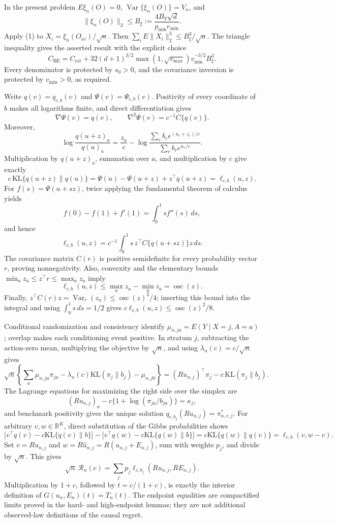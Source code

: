 In the present problem \(E\xi_n(O)=0\), \(\operatorname{Var}\{\xi_n(O)\}=V_n\), and
\[
 \|\xi_n(O)\|_2\le B_\xi:=\frac{4B_Y\sqrt d}{p_{\min}e_{\min}}.
\]
Apply (1) to \(X_i=\xi_n(O_{ni})/\sqrt n\).  Then \(\sum_iE\|X_i\|_2^3\le B_\xi^3/\sqrt n\).  The triangle inequality gives the asserted result with the explicit choice
\[
 C_{\mathrm{BE}}=C_{\mathrm{rat}}+
 32(d+1)^{3/2}\max(1,\sqrt{v_{\max}})v_{\min}^{-3/2}B_\xi^3.
\]
Every denominator is protected by \(s_0>0\), and the covariance inversion is protected by \(v_{\min}>0\), as required.

Write \(q(v)=q_{c,b}(v)\) and \(\Psi(v)=\Psi_{c,b}(v)\).  Positivity of every coordinate of \(b\) makes all logarithms finite, and direct differentiation gives
\[
 \nabla\Psi(v)=q(v),\qquad \nabla^2\Psi(v)=c^{-1}C\{q(v)\}.
\]
Moreover,
\[
 \log\frac{q(u+z)_a}{q(u)_a}
 =\frac{z_a}{c}-\log\frac{\sum_rb_r e^{(u_r+z_r)/c}}
                              {\sum_rb_r e^{u_r/c}}.
\]
Multiplication by \(q(u+z)_a\), summation over \(a\), and multiplication by \(c\) give exactly
\[
 c\,\mathrm{KL}\{q(u+z)\|q(u)\}
 =\Psi(u)-\Psi(u+z)+z^\top q(u+z)=\ell_{c,b}(u,z).
\]
For \(f(s)=\Psi(u+sz)\), twice applying the fundamental theorem of calculus yields
\[
 f(0)-f(1)+f'(1)=\int_0^1s f''(s)\,ds,
\]
and hence
\[
 \ell_{c,b}(u,z)=c^{-1}\int_0^1s\,z^\top C\{q(u+sz)\}z\,ds.
\]
The covariance matrix \(C(r)\) is positive semidefinite for every probability vector \(r\), proving nonnegativity.  Also, convexity and the elementary bounds \(\min_a z_a\le z^\top r\le\max_a z_a\) imply
\[
 \ell_{c,b}(u,z)\le \max_a z_a-\min_a z_a=\operatorname{osc}(z).
\]
Finally, \(z^\top C(r)z=\operatorname{Var}_r(z_a)\le\operatorname{osc}(z)^2/4\); inserting this bound into the integral and using \(\int_0^1s\,ds=1/2\) gives \(c\ell_{c,b}(u,z)\le\operatorname{osc}(z)^2/8\).

Conditional randomization and consistency identify \(\mu_{n,ja}=E(Y\mid X=j,A=a)\); overlap makes each conditioning event positive.  In stratum \(j\), subtracting the action-zero mean, multiplying the objective by \(\sqrt n\), and using \(\lambda_n(c)=c/\sqrt n\) gives
\[
 \sqrt n\left\{\sum_a\mu_{n,ja}\pi_{ja}-\lambda_n(c)\mathrm{KL}(\pi_j\|b_j)-\mu_{n,j0}\right\}
 =(Ru_{n,j})^\top\pi_j-c\,\mathrm{KL}(\pi_j\|b_j).
\]
The Lagrange equations for maximizing the right side over the simplex are
\[
 (Ru_{n,j})_a-c\{1+\log(\pi_{ja}/b_{ja})\}=\kappa_j,
\]
and benchmark positivity gives the unique solution \(q_{c,b_j}(Ru_{n,j})=\pi^*_{n,c,j}\).  For arbitrary \(v,w\in\mathbb R^K\), direct substitution of the Gibbs probabilities shows
\[
 \big[v^\top q(v)-c\mathrm{KL}\{q(v)\|b\}\big]
 -\big[v^\top q(w)-c\mathrm{KL}\{q(w)\|b\}\big]
 =c\mathrm{KL}\{q(w)\|q(v)\}=\ell_{c,b}(v,w-v).
\]
Set \(v=Ru_{n,j}\) and \(w=R\widehat u_{n,j}=R(u_{n,j}+E_{n,j})\), sum with weights \(p_j\), and divide by \(\sqrt n\).  This gives
\[
 \sqrt n\,\mathscr R_n(c)=\sum_jp_j\ell_{c,b_j}(Ru_{n,j},RE_{n,j}).
\]
Multiplication by \(1+c\), followed by \(t=c/(1+c)\), is exactly the interior definition of \(G(u_n,E_n)(t)=T_n(t)\).  The endpoint equalities are compactified limits proved in the hard- and high-endpoint lemmas; they are not additional observed-law definitions of the causal regret.

